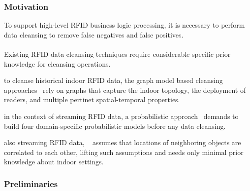\begin{frame}
\frametitle{Motivation}

To support high-level RFID business logic processing, it is necessary to perform data cleansing to remove false negatives and false positives.\\~\\

Existing RFID data cleansing techniques require considerable specific prior knowledge for cleansing operations.

\begin{sitemize}
  \item to cleanse historical indoor RFID data, the graph model based cleansing approaches~\cite{baba2013spatiotemporal,baba2013graph,DBLP:conf/edbt/FazzingaFFP14} rely on graphs that capture the indoor topology, the deployment of readers, and multiple pertinet spatial-temporal properties.
  \item in the context of streaming RFID data, a probabilistic approach~\cite{tran2009probabilistic} demands to build four domain-specific probabilistic models before any data cleansing.
  \item also streaming RFID data, ~\cite{nie2009probabilistic} assumes that locations of neighboring objects are correlated to each other, lifting such assumptions and needs only minimal prior knowledge about indoor settings.
\end{sitemize}

\end{frame}


\begin{frame}
\frametitle{Preliminaries}



\end{frame}
